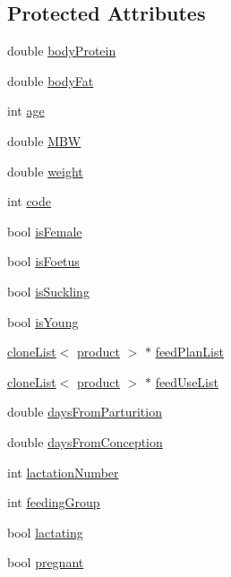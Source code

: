 \subsection*{Protected Attributes}
\begin{DoxyCompactItemize}
\item 
double \hyperlink{classcattle_adc9375abcc182c384874998ba6bfb91b}{bodyProtein}
\item 
double \hyperlink{classcattle_ace40244cf83a23b5a874f5f0185807fa}{bodyFat}
\item 
int \hyperlink{classcattle_abffa75c5af0af11f66f1217329dc71b2}{age}
\item 
double \hyperlink{classcattle_aad8eac52b29c71be5b0f6da7b4b76a6c}{MBW}
\item 
double \hyperlink{classcattle_a16519b87deea03a710cd5ce401fdb7ba}{weight}
\item 
int \hyperlink{classcattle_abeb37ebde95fcf8f746364102f91c94c}{code}
\item 
bool \hyperlink{classcattle_ae28249dd21e1e0f2978c5cad7bf3f53f}{isFemale}
\item 
bool \hyperlink{classcattle_a737451b41bd16074e295e3c395d17745}{isFoetus}
\item 
bool \hyperlink{classcattle_a40126fbf9c2ac40d3578b473e1ba37d1}{isSuckling}
\item 
bool \hyperlink{classcattle_a9fe83aba5038189445bbcf6e96fd4977}{isYoung}
\item 
\hyperlink{classclone_list}{cloneList}$<$ \hyperlink{classproduct}{product} $>$ $\ast$ \hyperlink{classcattle_ae291a15ac3fdf87ec6821d460d819b77}{feedPlanList}
\item 
\hyperlink{classclone_list}{cloneList}$<$ \hyperlink{classproduct}{product} $>$ $\ast$ \hyperlink{classcattle_a80820ab424613acc46294b15335b7507}{feedUseList}
\item 
double \hyperlink{classcattle_a6a51852f30326c7e77ac430c89033d0f}{daysFromParturition}
\item 
double \hyperlink{classcattle_a7e36c3531d8ae149261394dbfd8f3a51}{daysFromConception}
\item 
int \hyperlink{classcattle_ae67ed13b4012cda6f63a11098520ff07}{lactationNumber}
\item 
int \hyperlink{classcattle_a7cf86b18583399992fc6d0ed510a6b95}{feedingGroup}
\item 
bool \hyperlink{classcattle_a9d5b8f99a41523eb8c0792e49492e350}{lactating}
\item 
bool \hyperlink{classcattle_a457bb28e06317045be5fd9ebbac78d7e}{pregnant}

\end{DoxyCompactItemize}
